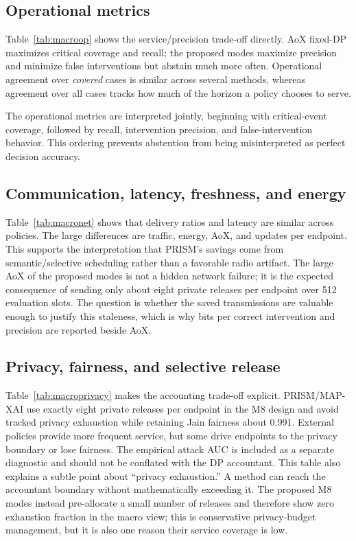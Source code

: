 \documentclass[11pt]{article}
\newcommand{\MAP}{MAP-XAI}
\begin{document}
\subsection{Operational metrics}
Table~\ref{tab:macroop} shows the service/precision trade-off directly. AoX fixed-DP maximizes critical coverage and recall; the proposed modes maximize precision and minimize false interventions but abstain much more often. Operational agreement over \emph{covered} cases is similar across several methods, whereas agreement over all cases tracks how much of the horizon a policy chooses to serve.

The operational metrics are interpreted jointly, beginning with critical-event coverage, followed by recall, intervention precision, and false-intervention behavior. This ordering prevents abstention from being misinterpreted as perfect decision accuracy.


\subsection{Communication, latency, freshness, and energy}
Table~\ref{tab:macronet} shows that delivery ratios and latency are similar across policies. The large differences are traffic, energy, AoX, and updates per endpoint. This supports the interpretation that PRISM's savings come from semantic/selective scheduling rather than a favorable radio artifact.
The large AoX of the proposed modes is not a hidden network failure; it is the expected consequence of sending only about eight private releases per endpoint over 512 evaluation slots. The question is whether the saved transmissions are valuable enough to justify this staleness, which is why bits per correct intervention and precision are reported beside AoX.


\subsection{Privacy, fairness, and selective release}
Table~\ref{tab:macroprivacy} makes the accounting trade-off explicit. PRISM/\MAP{} use exactly eight private releases per endpoint in the M8 design and avoid tracked privacy exhaustion while retaining Jain fairness about 0.991. External policies provide more frequent service, but some drive endpoints to the privacy boundary or lose fairness. The empirical attack AUC is included as a separate diagnostic and should not be conflated with the DP accountant.
This table also explains a subtle point about ``privacy exhaustion.'' A method can reach the accountant boundary without mathematically exceeding it. The proposed M8 modes instead pre-allocate a small number of releases and therefore show zero exhaustion fraction in the macro view; this is conservative privacy-budget management, but it is also one reason their service coverage is low.

\end{document}
